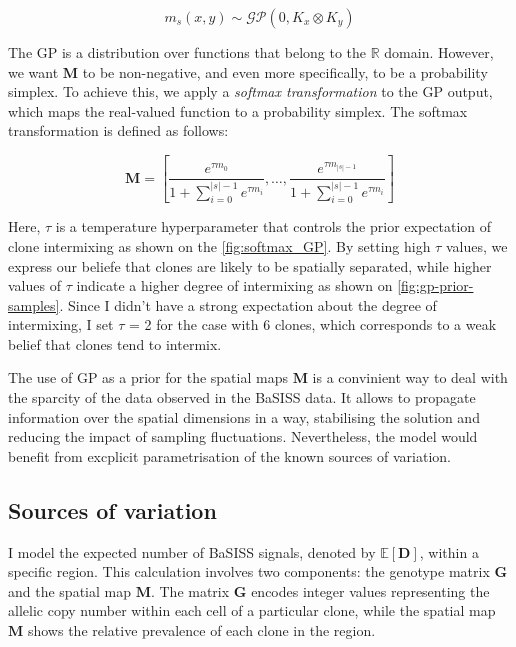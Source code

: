 \begin{equation}
    m_s(x,y) \sim \mathcal{GP}(0, K_x \otimes K_y)
\end{equation}

The \ac{GP} is a distribution over functions that belong to the $\mathbb{R}$ domain. However, 
we want $\mathbf{M}$ to be non-negative, and even more specifically, to be a probability simplex. To achieve this, we apply a \emph{softmax transformation} to the \ac{GP} output, which maps the real-valued function to a probability simplex. The softmax transformation is defined as follows:

\begin{equation}
    \mathbf{M} = \left[ \dfrac{e^{\tau m_0}}{1 + \sum_{i=0}^{|s|-1}{e^{\tau m_i}}}, \dots, \dfrac{e^{\tau m_{|s|-1}}}{1 + \sum_{i=0}^{|s|-1}{e^{\tau m_i}}} \right]
\end{equation}

Here, $\tau$ is a temperature hyperparameter that controls the prior expectation of clone intermixing as shown on the \cref{fig:softmax_GP}. By setting high $\tau$ values, we express our beliefe that clones are likely to be spatially separated, while higher values of $\tau$ indicate a higher degree of intermixing as shown on \cref{fig:gp-prior-samples}. Since I didn't have a strong expectation about the degree of intermixing, I set $\tau$ = 2 for the case with 6 clones, which corresponds to a weak belief that clones tend to intermix.

The use of \ac{GP} as a prior for the spatial maps $\mathbf{M}$ is a convinient way to deal with the sparcity of the data observed in the \ac{BaSISS} data. It allows to propagate information over the spatial dimensions in a  way, stabilising the solution and reducing the impact of sampling fluctuations. Nevertheless, the model would benefit from excplicit parametrisation of the known sources of variation.

\subsection{Sources of variation}

I model the expected number of \ac{BaSISS} signals, denoted by $\mathbb{E}[\mathbf{D}]$, within a specific region. This calculation involves two components: the genotype matrix $\mathbf{G}$ and the spatial map $\mathbf{M}$. The matrix $\mathbf{G}$ encodes integer values representing the allelic copy number within each cell of a particular clone, while the spatial map $\mathbf{M}$ shows the relative prevalence of each clone in the region.

